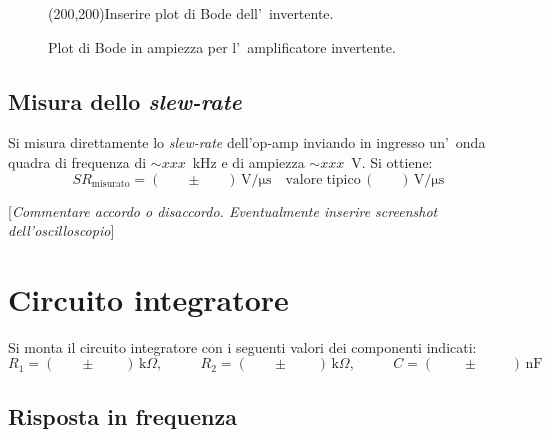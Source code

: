 \documentclass[10pt,a4paper]{article}
\newcommand{\rem}[1]{[\emph{#1}]}
\newcommand{\exn}{\phantom{xxx}}
\begin{document}
\begin{figure}[h]
\begin{center}
\framebox(200,200){Inserire plot di Bode dell'~invertente.}
\caption{\small Plot di Bode in ampiezza per l'~amplificatore invertente.}
\label{fig:bodeinv}
\end{center}
\end{figure}
%
\subsection{Misura dello \emph{slew-rate}}
Si misura direttamente lo \emph{slew-rate} dell'op-amp inviando in ingresso un'~onda quadra 
di frequenza di $\sim xxx$~kHz e di ampiezza $\sim xxx$~V. Si ottiene:
\[
SR_\mathrm{misurato} = (\exn \pm \exn )\,\mathrm{V/\mu s} \quad \mathrm{valore \; tipico}\, (\exn )\,\mathrm{V/\mu s}\
\]

\rem{Commentare accordo o disaccordo. Eventualmente inserire screenshot dell'oscilloscopio}
%
\section{Circuito integratore}
Si monta il circuito integratore con i seguenti valori  dei componenti indicati: 
\[
R_1 = (\exn \pm \exn \;) \,\mathrm{k}\Omega, \:\:\;\:\exn 
R_2 = (\exn \pm \exn \;) \,\mathrm{k}\Omega, \:\:\;\:\exn 
C = (\;\exn \pm \exn \;\;)\,\mathrm{nF}
\]

\subsection{Risposta in frequenza}
\end{document}
